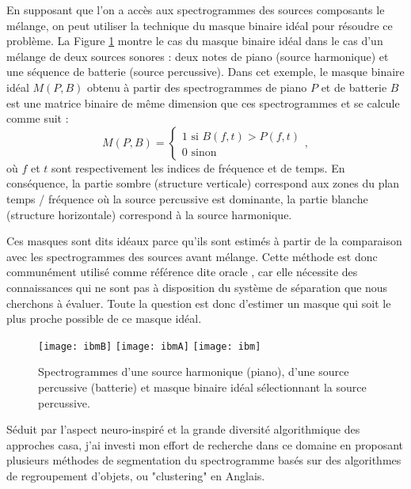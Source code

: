 En supposant que l'on a accès aux spectrogrammes des sources composants le mélange, on peut utiliser la technique du masque binaire idéal pour résoudre ce problème. La Figure \ref{fig:ibm} montre le cas du masque binaire idéal dans le cas d'un mélange de deux sources sonores : deux notes de piano (source harmonique) et une séquence de batterie (source percussive). Dans cet exemple, le masque binaire idéal $M(P, B)$ obtenu à partir des spectrogrammes de piano $P$ et de batterie $B$  est une matrice binaire de même dimension que ces spectrogrammes et se calcule comme suit :
\begin{equation}
M(P, B) =
\begin{cases}
  1 \text{ si } B(f,t)>P(f,t) \\
  0 \text{ sinon}
  \end{cases},
\end{equation}
où $f$ et $t$ sont respectivement les indices de fréquence et de temps. En conséquence, la partie sombre (structure verticale) correspond aux zones du plan temps / fréquence où la source percussive est dominante, la partie blanche (structure horizontale) correspond à la source harmonique.

Ces masques sont dits idéaux parce qu'ils sont estimés à partir de la comparaison avec les spectrogrammes des sources avant mélange. Cette méthode est donc communément utilisé comme référence dite \og oracle \fg, car elle nécessite des connaissances qui ne sont pas à disposition du système de séparation que nous cherchons à évaluer. Toute la question est donc d'estimer un masque qui soit le plus proche possible de ce masque idéal.

\begin{figure}[t]
  \texttt{[image: ibmB]}
  \texttt{[image: ibmA]}
  \texttt{[image: ibm]}
  \caption{Spectrogrammes d'une source harmonique (piano), d'une source percussive (batterie) et masque binaire idéal sélectionnant la source percussive.} \label{fig:ibm}
\end{figure}


Séduit par l'aspect neuro-inspiré et la grande diversité algorithmique des approches casa, j'ai investi mon effort de recherche dans ce domaine en proposant plusieurs méthodes de segmentation du spectrogramme basés sur des algorithmes de regroupement d'objets, ou "clustering" en Anglais.

